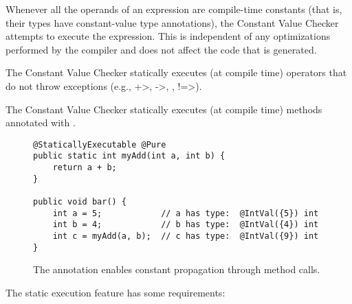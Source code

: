 
Whenever all the operands of an expression are compile-time constants (that
is, their types have constant-value type annotations), the Constant Value
Checker attempts to execute the expression.  This is independent of any
optimizations performed by the compiler and does not affect the code that
is generated.

The Constant Value Checker statically executes (at compile time) operators that do
not throw exceptions (e.g., \<+>, \<->, \code{<}\code{<}, \<!=>).



The Constant Value Checker statically executes (at compile time) methods annotated with
.

\begin{figure}
\begin{Verbatim}
@StaticallyExecutable @Pure
public static int myAdd(int a, int b) {
    return a + b;
}

public void bar() {
    int a = 5;            // a has type:  @IntVal({5}) int
    int b = 4;            // b has type:  @IntVal({4}) int
    int c = myAdd(a, b);  // c has type:  @IntVal({9}) int
}
\end{Verbatim}
\caption{The
   annotation enables
  constant propagation through method calls.}
\label{fig-staticallyexecutable}
\end{figure}

The static execution feature has some requirements:

